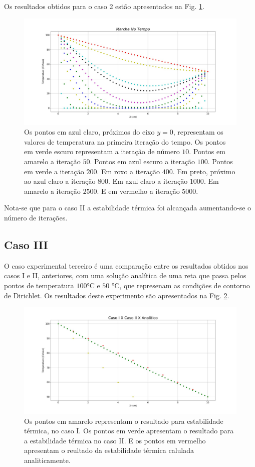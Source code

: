 \documentclass[12pt,a4paper,final]{report}%
\begin{document}
Os resultados obtidos para o caso 2 estão apresentados na Fig. \ref{ResultadoII}.

\begin{figure}[H]
\centering
\includegraphics[scale=0.35]{Imagens/Trab02.jpg}
\caption{Os pontos em azul claro, próximos do eixo $y=0$, representam os valores de temperatura na primeira iteração do tempo. Os pontos em verde escuro representam a iteração de número $10$. Pontos em amarelo a iteração $50$. Pontos em azul escuro a iteração $100$. Pontos em verde a iteração $200$. Em roxo a iteração $400$. Em preto, próximo ao azul claro a iteração $800$. Em azul claro a iteração $1000$. Em amarelo a iteração $2500$. E em vermelho a iteração $5000$.}
\label{ResultadoII}
\end{figure}

Nota-se que para o caso II a estabilidade térmica foi alcançada aumentando-se o número de iterações.

\subsection*{Caso III}

O caso experimental terceiro é uma comparação entre os resultados obtidos nos casos I e II, anteriores, com uma solução analítica de uma reta que passa pelos pontos de temperatura $100$°C e $50$ °C, que represenam as condições de contorno de Dirichlet. Os resultados deste experimento são apresentados na Fig. \ref{ResultadoIII}.


\begin{figure}[H]
\centering
\includegraphics[scale=0.35]{Imagens/Trab03.jpg}
\caption{Os pontos em amarelo representam o resultado para estabilidade térmica, no caso I. Os pontos em verde apresentam o resultado para a estabilidade térmica no caso II. E os pontos em vermelho apresentam o reultado da estabilidade térmica calulada analiticamente.}
\label{ResultadoIII}
\end{figure}
\end{document}
